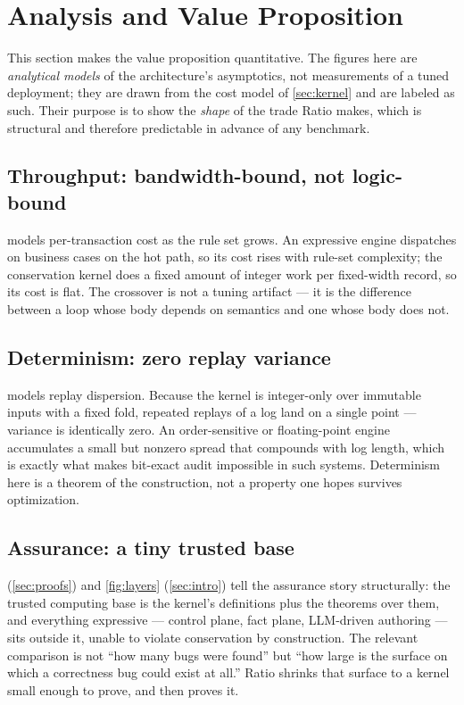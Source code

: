 \section{Analysis and Value Proposition}
\label{sec:eval}

This section makes the value proposition quantitative. The figures here
are \emph{analytical models} of the architecture's asymptotics, not
measurements of a tuned deployment; they are drawn from the cost model of
\cref{sec:kernel} and are labeled as such. Their purpose is to show the
\emph{shape} of the trade Ratio makes, which is structural and therefore
predictable in advance of any benchmark.

\subsection{Throughput: bandwidth-bound, not logic-bound}

 models per-transaction cost as the rule set grows.
An expressive engine dispatches on business cases on the hot path, so its
cost rises with rule-set complexity; the conservation kernel does a
fixed amount of integer work per fixed-width record, so its cost is flat.
The crossover is not a tuning artifact --- it is the difference between a
loop whose body depends on semantics and one whose body does not.

\subsection{Determinism: zero replay variance}

 models replay dispersion. Because the kernel is
integer-only over immutable inputs with a fixed fold, repeated replays of
a log land on a single point --- variance is identically zero. An
order-sensitive or floating-point engine accumulates a small but nonzero
spread that compounds with log length, which is exactly what makes
bit-exact audit impossible in such systems. Determinism here is a
theorem of the construction, not a property one hopes survives
optimization.

\subsection{Assurance: a tiny trusted base}

 (\cref{sec:proofs}) and \cref{fig:layers}
(\cref{sec:intro}) tell the assurance story structurally: the trusted
computing base is the kernel's definitions plus the theorems over them,
and everything expressive --- control plane, fact plane, LLM-driven
authoring --- sits outside it, unable to violate conservation by
construction. The relevant comparison is not ``how many bugs were found''
but ``how large is the surface on which a correctness bug could exist at
all.'' Ratio shrinks that surface to a kernel small enough to prove, and
then proves it.

